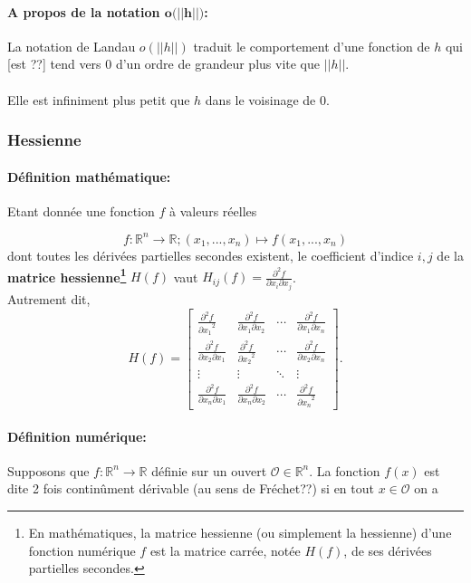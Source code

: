 		\paragraph*{A propos de la notation $\textbf{o(||h||)}$:}
		La notation de Landau $o(||h||)$ traduit le comportement d’une fonction de $h$ qui [est ??] tend vers $0$ d’un ordre de grandeur plus vite que $||h||$.\\\\
		Elle est infiniment plus petit que $h$ dans le voisinage de $0$.
		
		
			
	\subsubsection{Hessienne}
	\paragraph*{Définition mathématique:}
	Etant donnée une fonction ${f}$ à valeurs réelles
	
	$${ f:\mathbb{R}^{n}\to \mathbb {R} ;(x_{1},...,x_{n})\mapsto f(x_{1},...,x_{n})}$$
	dont toutes les dérivées partielles secondes existent, le coefficient d'indice ${ i,j}$ de la \textbf{matrice hessienne\footnote{En mathématiques, la matrice hessienne (ou simplement la hessienne) d'une fonction numérique $f$ est la matrice carrée, notée $H(f)$, de ses dérivées partielles secondes.}} ${H(f)}$ vaut ${H_{ij}(f)={\frac {\partial ^{2}f}{\partial x_{i}\partial x_{j}}}}$.\\
	Autrement dit,
	$$
	{ H(f)={
		\begin{bmatrix}{
			\frac {\partial ^{2}f}{{\partial x_{1}}^{2}}}&{\frac {\partial ^{2}f}{\partial x_{1}\partial x_{2}}}&\cdots &{\frac {\partial ^{2}f}{\partial x_{1}\partial x_{n}}}\\
			{\frac {\partial ^{2}f}{\partial x_{2}\partial x_{1}}}&{\frac {\partial ^{2}f}{{\partial x_{2}}^{2}}}&\cdots &{\frac {\partial ^{2}f}{\partial x_{2}\partial x_{n}}}\\
			\vdots &\vdots &\ddots &\vdots \\
			{\frac {\partial ^{2}f}{\partial x_{n}\partial x_{1}}}&{\frac {\partial ^{2}f}{\partial x_{n}\partial x_{2}}}&\cdots &{\frac {\partial ^{2}f}{{\partial x_{n}}^{2}}}
		\end{bmatrix}}} .
	$$
	
	\paragraph*{Définition numérique:}
	Supposons que $f : \mathbb{R}^{n} \to \mathbb{R}$ définie sur un ouvert $\mathcal{O} \in \mathbb{R}^{n}$. La fonction $f(x)$ est dite 2
	fois continûment dérivable (au sens de Fréchet??) si en tout $x \in \mathcal{O}$ on a
	
